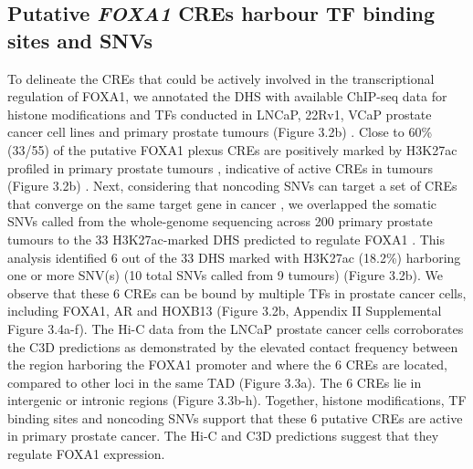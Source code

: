 
\subsection{Putative \emph{FOXA1} CREs harbour TF binding sites and SNVs}

To delineate the CREs that could be actively involved in the transcriptional regulation of FOXA1, we annotated the DHS with available ChIP-seq data for histone modifications and TFs conducted in LNCaP, 22Rv1, VCaP prostate cancer cell lines and primary prostate tumours (Figure 3.2b) \cite{pomerantzAndrogenReceptorCistrome2015,kronTMPRSS2ERGFusion2017}.
Close to 60\% (33/55) of the putative FOXA1 plexus CREs are positively marked by H3K27ac profiled in primary prostate tumours \cite{kronTMPRSS2ERGFusion2017}, indicative of active CREs in tumours (Figure 3.2b) \cite{creyghtonHistoneH3K27acSeparates2010}.
Next, considering that noncoding SNVs can target a set of CREs that converge on the same target gene in cancer \cite{baileyNoncodingSomaticInherited2016}, we overlapped the somatic SNVs called from the whole-genome sequencing across 200 primary prostate tumours to the 33 H3K27ac-marked DHS predicted to regulate FOXA1 \cite{fraserGenomicHallmarksLocalized2017,espirituEvolutionaryLandscapeLocalized2018}.
This analysis identified 6 out of the 33 DHS marked with H3K27ac (18.2\%) harboring one or more SNV(s) (10 total SNVs called from 9 tumours) (Figure 3.2b).
We observe that these 6 CREs can be bound by multiple TFs in prostate cancer cells, including FOXA1, AR and HOXB13 (Figure 3.2b, Appendix II Supplemental Figure 3.4a-f).
The Hi-C data from the LNCaP prostate cancer cells corroborates the C3D predictions as demonstrated by the elevated contact frequency between the region harboring the FOXA1 promoter and where the 6 CREs are located, compared to other loci in the same TAD (Figure 3.3a).
The 6 CREs lie in intergenic or intronic regions (Figure 3.3b-h).
Together, histone modifications, TF binding sites and noncoding SNVs support that these 6 putative CREs are active in primary prostate cancer.
The Hi-C and C3D predictions suggest that they regulate FOXA1 expression.

